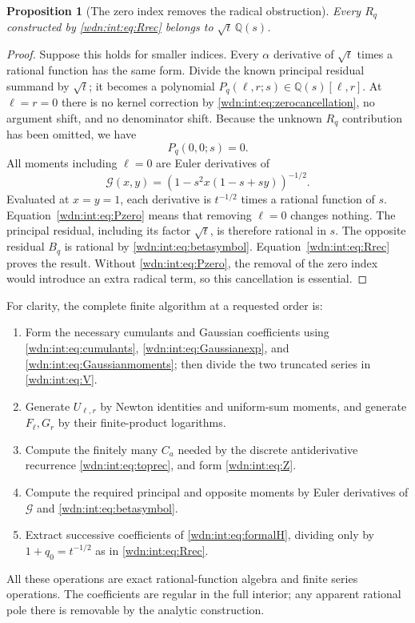 \documentclass[11pt,letterpaper]{article}
\newtheorem{proposition}[theorem]{Proposition}
\theoremstyle{remark}\newtheorem{remark}[theorem]{Remark}
\newcommand{\Q}{\mathbb Q}
\begin{document}
\begin{proposition}[The zero index removes the radical obstruction]
Every $R_q$ constructed by \eqref{wdn:int:eq:Rrec} belongs to $\sqrt t\,\Q(s)$.
\end{proposition}
\begin{proof}
Suppose this holds for smaller indices. Every $\alpha$ derivative of
$\sqrt t$ times a rational function has the same form. Divide the known
principal residual summand by $\sqrt t$; it becomes a polynomial
$P_q(\ell,r;s)\in\Q(s)[\ell,r]$. At $\ell=r=0$ there is no kernel
correction by \eqref{wdn:int:eq:zerocancellation}, no argument shift, and no
denominator shift. Because the unknown $R_q$ contribution has been
omitted, we have
\begin{equation}\label{wdn:int:eq:Pzero}
 P_q(0,0;s)=0.
\end{equation}
All moments including $\ell=0$ are Euler derivatives of
\[
 \mathcal G(x,y)=(1-s^2x(1-s+sy))^{-1/2}.
\]
Evaluated at $x=y=1$, each derivative is $t^{-1/2}$ times a rational
function of $s$. Equation~\eqref{wdn:int:eq:Pzero} means that removing $\ell=0$
changes nothing. The principal residual, including its factor $\sqrt t$,
is therefore rational in $s$. The opposite residual $B_q$ is rational
by \eqref{wdn:int:eq:betasymbol}. Equation~\eqref{wdn:int:eq:Rrec} proves the result.
Without \eqref{wdn:int:eq:Pzero}, the removal of the zero index would introduce
an extra radical term, so this cancellation is essential.
\end{proof}

For clarity, the complete finite algorithm at a requested order is:
\begin{enumerate}
\item Form the necessary cumulants and Gaussian coefficients using
\eqref{wdn:int:eq:cumulants}, \eqref{wdn:int:eq:Gaussianexp}, and \eqref{wdn:int:eq:Gaussianmoments};
then divide the two truncated series in \eqref{wdn:int:eq:V}.
\item Generate $U_{\ell,r}$ by Newton identities and uniform-sum moments,
and generate $F_\ell,G_r$ by their finite-product logarithms.
\item Compute the finitely many $C_a$ needed by the discrete
antiderivative recurrence \eqref{wdn:int:eq:toprec}, and form \eqref{wdn:int:eq:Z}.
\item Compute the required principal and opposite moments by Euler
derivatives of $\mathcal G$ and \eqref{wdn:int:eq:betasymbol}.
\item Extract successive coefficients of \eqref{wdn:int:eq:formalH}, dividing
only by $1+q_0=t^{-1/2}$ as in \eqref{wdn:int:eq:Rrec}.
\end{enumerate}
All these operations are exact rational-function algebra and finite
series operations. The coefficients are regular in the full interior;
any apparent rational pole there is removable by the analytic construction.
\end{document}
